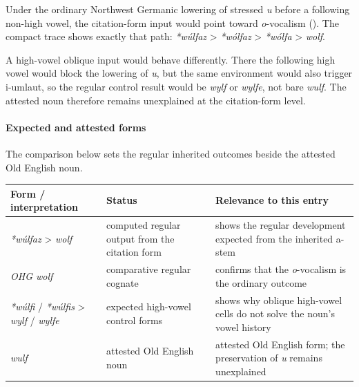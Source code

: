 \documentclass[
  british,
  a4paper,
]{article}
\newcounter{none} %
\begin{document}
Under the ordinary Northwest Germanic lowering of stressed \emph{u}
before a following non-high vowel, the citation-form input would point
toward \emph{o}-vocalism (). The compact trace shows exactly that path:
\emph{*wúlfaz} \textgreater{} \emph{*wólfaz} \textgreater{}
\emph{*wólfa} \textgreater{} \emph{wolf}.

A high-vowel oblique input would behave differently. There the following
high vowel would block the lowering of \emph{u}, but the same
environment would also trigger i-umlaut, so the regular control result
would be \emph{wylf} or \emph{wylfe}, not bare \emph{wulf}. The attested
noun therefore remains unexplained at the citation-form level.

\paragraph{Expected and attested
forms}\label{expected-and-attested-forms-2}

The comparison below sets the regular inherited outcomes beside the
attested Old English noun.

{\def\LTcaptype{none} %
\begin{longtable}[]{@{}
  >{\raggedright\arraybackslash}p{}
  >{\raggedright\arraybackslash}p{}
  >{\raggedright\arraybackslash}p{}@{}}
\toprule\noalign{}
\begin{minipage}[b]{\linewidth}\raggedright
Form / interpretation
\end{minipage} & \begin{minipage}[b]{\linewidth}\raggedright
Status
\end{minipage} & \begin{minipage}[b]{\linewidth}\raggedright
Relevance to this entry
\end{minipage} \\
\midrule\noalign{}
\endhead
\bottomrule\noalign{}
\endlastfoot
\emph{*wúlfaz} \textgreater{} \emph{wolf} & computed regular output from
the citation form & shows the regular development expected from the
inherited a-stem \\
\emph{OHG wolf} & comparative regular cognate & confirms that the
\emph{o}-vocalism is the ordinary outcome \\
\emph{*wúlfi} / \emph{*wúlfis} \textgreater{} \emph{wylf} / \emph{wylfe}
& expected high-vowel control forms & shows why oblique high-vowel cells
do not solve the noun's vowel history \\
\emph{wulf} & attested Old English noun & attested Old English form; the
preservation of \emph{u} remains unexplained \\
\end{longtable}
}
\end{document}
